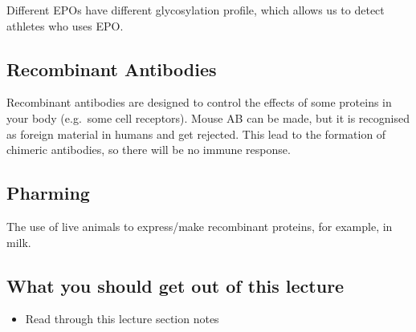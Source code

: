 Different EPOs have different glycosylation profile, which allows us to detect athletes who uses EPO.

\subsection{Recombinant Antibodies}

Recombinant antibodies are designed to control the effects of some proteins in your body (e.g.\ some cell receptors).
Mouse AB can be made, but it is recognised as foreign material in humans and get rejected.
This lead to the formation of chimeric antibodies, so there will be no immune response.

\begin{center}
\end{center}

\subsection{Pharming}

The use of live animals to express/make recombinant proteins, for example, in milk.

\subsection*{What you should get out of this lecture}

\begin{itemize}
	\item Read through this lecture section notes
\end{itemize}


